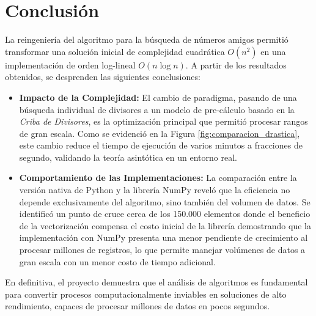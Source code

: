 \section{Conclusión}

La reingeniería del algoritmo para la búsqueda de números amigos permitió transformar una solución inicial de complejidad cuadrática $O(n^2)$ en una implementación de orden log-lineal $O(n \log n)$. A partir de los resultados obtenidos, se desprenden las siguientes conclusiones:

\begin{itemize}
    \item \textbf{Impacto de la Complejidad:} El cambio de paradigma, pasando de una búsqueda individual de divisores a un modelo de pre-cálculo basado en la \textit{Criba de Divisores}, es la optimización principal que permitió procesar rangos de gran escala. Como se evidenció en la Figura \ref{fig:comparacion_drastica}, este cambio reduce el tiempo de ejecución de varios minutos a fracciones de segundo, validando la teoría asintótica en un entorno real.
    
    \item \textbf{Comportamiento de las Implementaciones:} La comparación entre la versión nativa de Python y la librería NumPy reveló que la eficiencia no depende exclusivamente del algoritmo, sino también del volumen de datos. Se identificó un punto de cruce cerca de los 150.000 elementos donde el beneficio de la vectorización compensa el costo inicial de la librería demostrando que la implementación con NumPy presenta una menor pendiente de crecimiento al procesar millones de registros, lo que permite manejar volúmenes de datos a gran escala con un menor costo de tiempo adicional.
    
\end{itemize}

En definitiva, el proyecto demuestra que el análisis de algoritmos es fundamental para convertir procesos computacionalmente inviables en soluciones de alto rendimiento, capaces de procesar millones de datos en pocos segundos.

